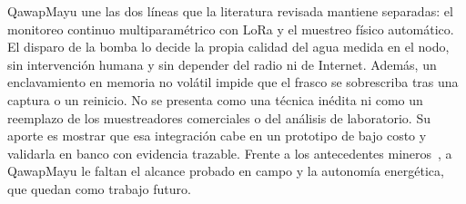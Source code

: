 QawapMayu une las dos líneas que la literatura revisada mantiene separadas: el monitoreo continuo multiparamétrico con LoRa y el muestreo físico automático. El disparo de la bomba lo decide la propia calidad del agua medida en el nodo, sin intervención humana y sin depender del radio ni de Internet. Además, un enclavamiento en memoria no volátil impide que el frasco se sobrescriba tras una captura o un reinicio. No se presenta como una técnica inédita ni como un reemplazo de los muestreadores comerciales o del análisis de laboratorio. Su aporte es mostrar que esa integración cabe en un prototipo de bajo costo y validarla en banco con evidencia trazable. Frente a los antecedentes mineros~\cite{bo2022,yasutaka2024}, a QawapMayu le faltan el alcance probado en campo y la autonomía energética, que quedan como trabajo futuro.
